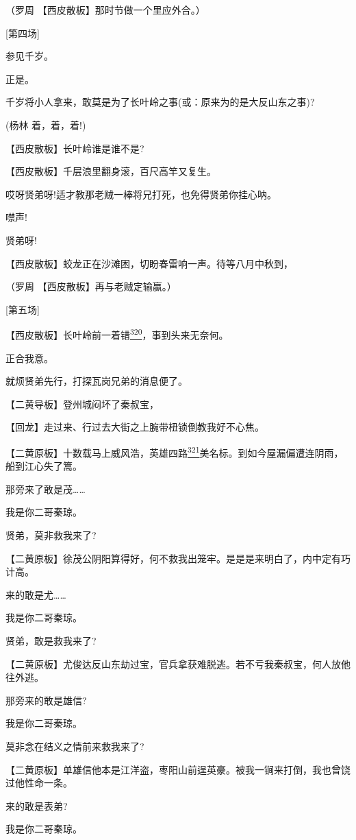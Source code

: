 （罗周 【西皮散板】那时节做一个里应外合。）

{[}第四场{]}

参见千岁。

正是。

千岁将小人拿来，敢莫是为了长叶岭之事(或：原来为的是大反山东之事)?

(杨林 着，着，着!)

【西皮散板】长叶岭谁是谁不是?

【西皮散板】千层浪里翻身滚，百尺高竿又复生。

哎呀贤弟呀!适才教那老贼一棒将兄打死，也免得贤弟你挂心呐。

噤声!

贤弟呀!

【西皮散板】蛟龙正在沙滩困，切盼春雷响一声。待等八月中秋到，

（罗周 【西皮散板】再与老贼定输赢。）

{[}第五场{]}

【西皮散板】长叶岭前一着错\protect\hyperlink{fn320}{\textsuperscript{320}}，事到头来无奈何。

正合我意。

就烦贤弟先行，打探瓦岗兄弟的消息便了。

【二黄导板】登州城闷坏了秦叔宝，

【回龙】走过来、行过去大街之上腕带杻锁倒教我好不心焦。

【二黄原板】十数载马上威风浩，英雄四路\protect\hyperlink{fn321}{\textsuperscript{321}}美名标。到如今屋漏偏遭连阴雨，船到江心失了篙。

那旁来了敢是茂\ldots{}\ldots{}

我是你二哥秦琼。

贤弟，莫非救我来了?

【二黄原板】徐茂公阴阳算得好，何不救我出笼牢。是是是来明白了，内中定有巧计高。

来的敢是尤\ldots{}\ldots{}

我是你二哥秦琼。

贤弟，敢是救我来了?

【二黄原板】尤俊达反山东劫过宝，官兵拿获难脱逃。若不亏我秦叔宝，何人放他往外逃。

那旁来的敢是雄信?

我是你二哥秦琼。

莫非念在结义之情前来救我来了?

【二黄原板】单雄信他本是江洋盗，枣阳山前逞英豪。被我一锏来打倒，我也曾饶过他性命一条。

来的敢是表弟?

我是你二哥秦琼。

